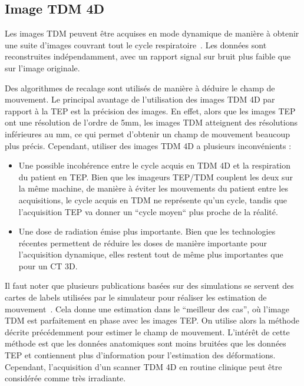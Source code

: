 \subsection{Image TDM 4D}

Les images TDM peuvent être acquises en mode dynamique de manière à obtenir une suite d'images couvrant tout le cycle respiratoire~\cite{lamare2007list, qiao2006motion}. Les données sont reconstruites indépendamment, avec un rapport signal sur bruit plus faible que sur l'image originale. 

Des algorithmes de recalage sont utilisés de manière à déduire le champ de mouvement. Le principal avantage de l'utilisation des images TDM 4D par rapport à la TEP est la précision des images. En effet, alors que les images TEP ont une résolution de l'ordre de 5mm, les images TDM atteignent des résolutions inférieures au mm, ce qui permet d'obtenir un champ de mouvement beaucoup plus précis. Cependant, utiliser des images TDM 4D a plusieurs inconvénients :

\begin{itemize}
 \item Une possible incohérence entre le cycle acquis en TDM 4D et la respiration du patient en TEP. Bien que les imageurs TEP/TDM couplent les deux sur la même machine, de manière à éviter les mouvements du patient entre les acquisitions, le cycle acquis en TDM ne représente qu'un cycle, tandis que l'acquisition TEP va donner un ``cycle moyen`` plus proche de la réalité.
 \item Une dose de radiation émise plus importante. Bien que les technologies récentes permettent de réduire les doses de manière importante pour l'acquisition dynamique, elles restent tout de même plus importantes que pour un CT 3D.
\end{itemize}

Il faut noter que plusieurs publications basées sur des simulations se servent des cartes de labels utilisées par le simulateur pour réaliser les estimation de mouvement~\cite{lamare2007list}. Cela donne une estimation dans le ``meilleur des cas'', où l'image TDM est parfaitement en phase avec les images TEP. On utilise alors la méthode décrite précédemment pour estimer le champ de mouvement. L'intérêt de cette méthode est que les données anatomiques sont moins bruitées que les données TEP et contiennent plus d'information pour l'estimation des déformations. Cependant, l'acquisition d'un scanner TDM 4D en routine clinique peut être considérée comme très irradiante.

